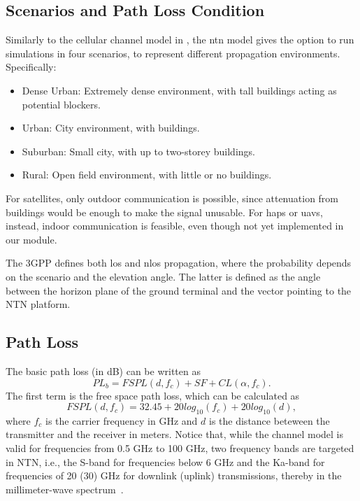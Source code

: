 \subsection{Scenarios and Path Loss Condition}
Similarly to the cellular channel model in \cite{TR38901}, the \gls{ntn} model gives the option to run simulations in four {scenarios}, to represent different propagation environments. Specifically:
\begin{itemize}
    \item Dense Urban: Extremely dense environment, with tall buildings acting as potential blockers.
    \item Urban: City environment, with buildings.
    \item Suburban: Small city, with up to two-storey buildings.
    \item Rural: Open field environment, with little or no buildings.
\end{itemize}
For satellites, only outdoor communication is possible, since attenuation from buildings would be enough to make the signal unusable. For \glspl{hap} or \glspl{uav}, instead, indoor communication is feasible, even though not yet implemented in our module. 

The 3GPP defines both \gls{los} and \gls{nlos} propagation, where the probability depends on the scenario and the elevation angle. The latter is defined as the angle between the horizon plane of the ground terminal and the vector pointing to the NTN platform. 

\subsection{Path Loss}
The basic path loss (in dB) can be written as
\begin{equation}
    PL_{b} = FSPL(d,f_{c})+SF+CL(\alpha,f_{c}).
    \label{eq:pl-fsp}
\end{equation}
The first term is the free space path loss, which can be calculated as
\begin{equation}
    FSPL(d,f_{c}) = 32.45 + 20log_{10}(f_{c}) + 20log_{10}(d),
\end{equation}
where $f_{c}$ is the carrier frequency in GHz and $d$ is the distance beteween the transmitter and the receiver in meters.
Notice that, while the channel model is valid for frequencies from 0.5 GHz to 100 GHz, two frequency bands are targeted in NTN, i.e., the S-band for frequencies below 6 GHz and the Ka-band for frequencies of 20 (30) GHz for downlink (uplink) transmissions, thereby in the millimeter-wave spectrum~\cite{giordani2020satellite}.

